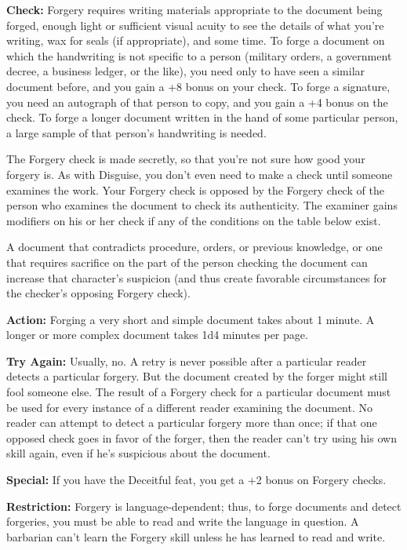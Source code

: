 \textbf{Check:} Forgery requires writing materials appropriate to the document being forged, enough light or sufficient visual acuity to see the details of what you're writing, wax for seals (if appropriate), and some time. To forge a document on which the handwriting is not specific to a person (military orders, a government decree, a business ledger, or the like), you need only to have seen a similar document before, and you gain a +8 bonus on your check. To forge a signature, you need an autograph of that person to copy, and you gain a +4 bonus on the check. To forge a longer document written in the hand of some particular person, a large sample of that person's handwriting is needed.

The Forgery check is made secretly, so that you're not sure how good your forgery is. As with Disguise, you don't even need to make a check until someone examines the work. Your Forgery check is opposed by the Forgery check of the person who examines the document to check its authenticity. The examiner gains modifiers on his or her check if any of the conditions on the table below exist.


A document that contradicts procedure, orders, or previous knowledge, or one that requires sacrifice on the part of the person checking the document can increase that character's suspicion (and thus create favorable circumstances for the checker's opposing Forgery check).

\textbf{Action:} Forging a very short and simple document takes about 1 minute. A longer or more complex document takes 1d4 minutes per page.

\textbf{Try Again:} Usually, no. A retry is never possible after a particular reader detects a particular forgery. But the document created by the forger might still fool someone else. The result of a Forgery check for a particular document must be used for every instance of a different reader examining the document. No reader can attempt to detect a particular forgery more than once; if that one opposed check goes in favor of the forger, then the reader can't try using his own skill again, even if he's suspicious about the document.

\textbf{Special:} If you have the Deceitful feat, you get a +2 bonus on Forgery checks.

\textbf{Restriction:} Forgery is language-dependent; thus, to forge documents and detect forgeries, you must be able to read and write the language in question. A barbarian can't learn the Forgery skill unless he has learned to read and write.